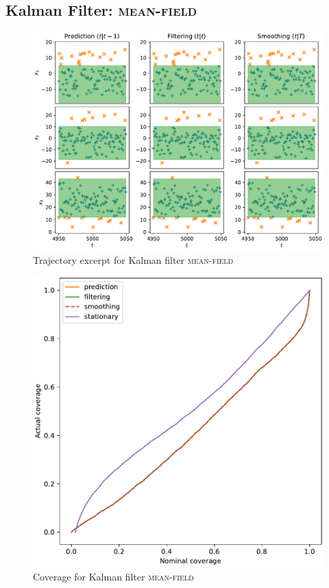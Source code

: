 \subsection{Kalman Filter: {\textsc{mean-field}}}
\begin{figure}[H]
\begin{center}
\includegraphics[width=\linewidth]{generated/trajectory/Method.MEAN_FIELD-Recalibrate.NO.pdf}
\end{center}
\caption{Trajectory excerpt for Kalman filter \textsc{{\textsc{mean-field}}}}
\end{figure}
\begin{figure}[H]
\begin{center}
\includegraphics[width=\linewidth]{generated/coverage/Method.MEAN_FIELD-Recalibrate.NO.pdf}
\end{center}
\caption{Coverage for Kalman filter \textsc{{\textsc{mean-field}}}}
\end{figure}
